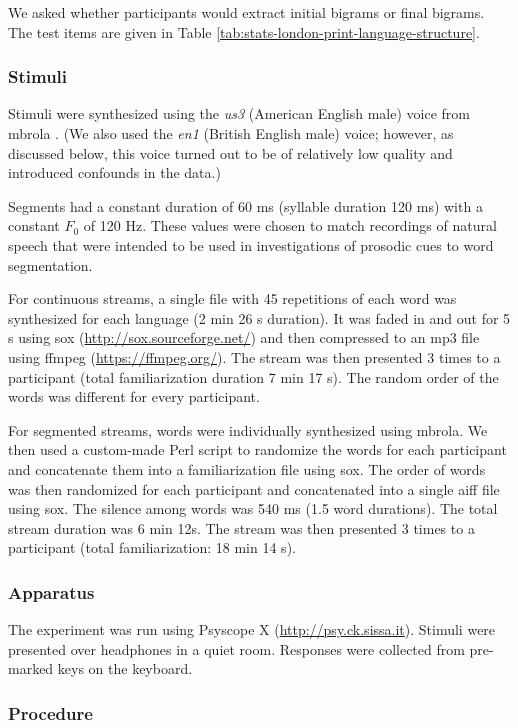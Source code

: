 \documentclass[]{article}
\begin{document}
We asked whether participants would extract initial bigrams or final bigrams. The test items are given in Table \ref{tab:stats-london-print-language-structure}.

\subsubsection{Stimuli}\label{stimuli}

Stimuli were synthesized using the \emph{us3} (American English male) voice from mbrola \citep{mbrola}. (We also used the \emph{en1} (British English male) voice; however, as discussed below, this voice turned out to be of relatively low quality and introduced confounds in the data.)

Segments had a constant duration of 60 ms (syllable duration 120 ms) with a constant \(F_0\) of 120 Hz. These values were chosen to match recordings of natural speech that were intended to be used in investigations of prosodic cues to word segmentation.

For continuous streams, a single file with 45 repetitions of each word was synthesized for each language (2 min 26 s duration). It was faded in and out for 5 s using sox (\url{http://sox.sourceforge.net/}) and then compressed to an mp3 file using ffmpeg (\url{https://ffmpeg.org/}). The stream was then presented 3 times to a participant (total familiarization duration 7 min 17 s). The random order of the words was different for every participant.

For segmented streams, words were individually synthesized using mbrola. We then used a custom-made Perl script to randomize the words for each participant and concatenate them into a familiarization file using sox. The order of words was then randomized for each participant and concatenated into a single aiff file using sox. The silence among words was 540 ms (1.5 word durations). The total stream duration was 6 min 12s. The stream was then presented 3 times to a participant (total familiarization: 18 min 14 s).

\subsubsection{Apparatus}\label{apparatus}

The experiment was run using Psyscope X (\url{http://psy.ck.sissa.it}). Stimuli were presented over headphones in a quiet room. Responses were collected from pre-marked keys on the keyboard.

\subsubsection{Procedure}\label{procedure}
\end{document}
